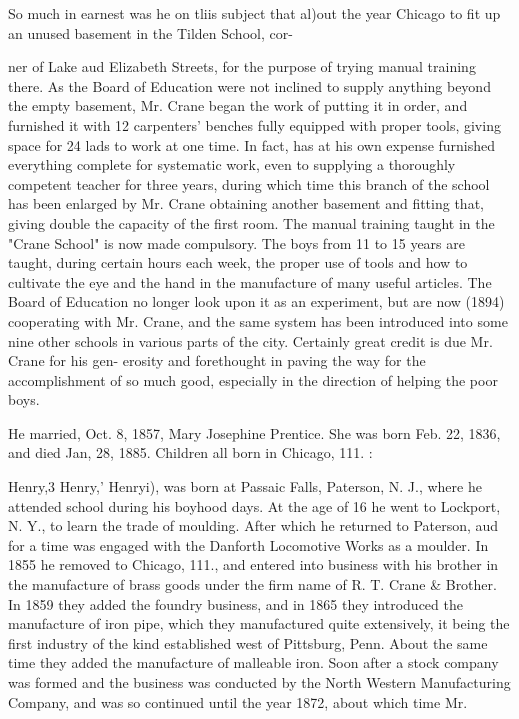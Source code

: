 \documentclass[oneside]{book}
\begin{document}
So much in earnest was he on tliis subject that al)out the year 
Chicago to fit up an unused basement in the Tilden School, cor- 




ner of Lake aud Elizabeth Streets, for the purpose of trying 
manual training there. As the Board of Education were not 
inclined to supply anything beyond the empty basement, Mr. 
Crane began the work of putting it in order, and furnished it 
with 12 carpenters' benches fully equipped with proper tools, 
giving space for 24 lads to work at one time. In fact, has at his 
own expense furnished everything complete for systematic work, 
even to supplying a thoroughly competent teacher for three years, 
during which time this branch of the school has been enlarged by 
Mr. Crane obtaining another basement and fitting that, giving 
double the capacity of the first room. The manual training 
taught in the "Crane School" is now made compulsory. The 
boys from 11 to 15 years are taught, during certain hours each 
week, the proper use of tools and how to cultivate the eye and 
the hand in the manufacture of many useful articles. The Board 
of Education no longer look upon it as an experiment, but are 
now (1894) cooperating with Mr. Crane, and the same system 
has been introduced into some nine other schools in various parts 
of the city. Certainly great credit is due Mr. Crane for his gen- 
erosity and forethought in paving the way for the accomplishment 
of so much good, especially in the direction of helping the poor 
boys. 

He married, Oct. 8, 1857, Mary Josephine Prentice. She was 
born Feb. 22, 1836, and died Jan, 28, 1885. Children all born 
in Chicago, 111. : 










Henry,3 Henry,' Henryi), was born at Passaic Falls, Paterson, 
N. J., where he attended school during his boyhood days. At 
the age of 16 he went to Lockport, N. Y., to learn the trade of 
moulding. After which he returned to Paterson, aud for a time 
was engaged with the Danforth Locomotive Works as a moulder. 
In 1855 he removed to Chicago, 111., and entered into business 
with his brother in the manufacture of brass goods under the firm 
name of R. T. Crane \& Brother. In 1859 they added the foundry 
business, and in 1865 they introduced the manufacture of iron 
pipe, which they manufactured quite extensively, it being the 
first industry of the kind established west of Pittsburg, Penn. 
About the same time they added the manufacture of malleable 
iron. Soon after a stock company was formed and the business 
was conducted by the North Western Manufacturing Company, 
and was so continued until the year 1872, about which time Mr. 
\end{document}
